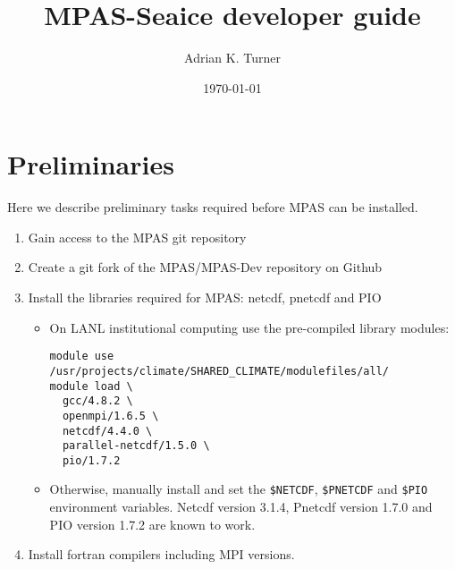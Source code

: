 \documentclass{article}
\begin{document}
\title{MPAS-Seaice developer guide}
\author{Adrian K. Turner} 
\date{\today}
\maketitle


\section{Preliminaries}
\label{sec:preliminaries}

Here we describe preliminary tasks required before MPAS can be installed.

\begin{enumerate}

\item Gain access to the MPAS git repository

\item Create a git fork of the MPAS/MPAS-Dev repository on Github

\item Install the libraries required for MPAS: netcdf, pnetcdf and PIO

\begin{itemize}

\item On LANL institutional computing use the pre-compiled library modules:

\begin{verbatim}
module use /usr/projects/climate/SHARED_CLIMATE/modulefiles/all/
module load \
  gcc/4.8.2 \
  openmpi/1.6.5 \
  netcdf/4.4.0 \
  parallel-netcdf/1.5.0 \
  pio/1.7.2
\end{verbatim}

\item Otherwise, manually install and set the \verb+$NETCDF+, \verb+$PNETCDF+ and \verb+$PIO+ environment variables. Netcdf version 3.1.4, Pnetcdf version 1.7.0 and PIO version 1.7.2 are known to work.

\end{itemize}

\item Install fortran compilers including MPI versions.

\end{enumerate}

\end{document}
